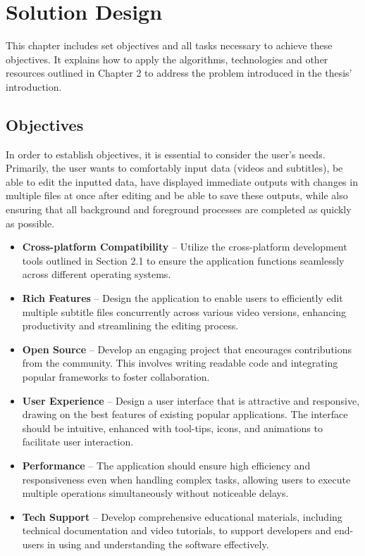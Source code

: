 \chapter{Solution Design}

This chapter includes set objectives and all tasks necessary to achieve these objectives. It explains how to apply the algorithms, technologies and other resources outlined in Chapter 2 to address the problem introduced in the thesis' introduction.

\section{Objectives}

In order to establish objectives, it is essential to consider the user's needs. Primarily, the user wants to comfortably input data (videos and subtitles), be able to edit the inputted data, have displayed immediate outputs with changes in multiple files at once after editing and be able to save these outputs, while also ensuring that all background and foreground processes are completed as quickly as possible.

\begin{itemize}
\item \textbf{Cross-platform Compatibility} -- Utilize the cross-platform development tools outlined in Section 2.1 to ensure the application functions seamlessly across different operating systems.
\item \textbf{Rich Features} -- Design the application to enable users to efficiently edit multiple subtitle files concurrently across various video versions, enhancing productivity and streamlining the editing process.
\item \textbf{Open Source} -- Develop an engaging project that encourages contributions from the community. This involves writing readable code and integrating popular frameworks to foster collaboration.
\item \textbf{User Experience} -- Design a user interface that is attractive and responsive, drawing on the best features of existing popular applications. The interface should be intuitive, enhanced with tool-tips, icons, and animations to facilitate user interaction.
\label{design:objectives:ui}
\item \textbf{Performance} -- The application should ensure high efficiency and responsiveness even when handling complex tasks, allowing users to execute multiple operations simultaneously without noticeable delays.
\item \textbf{Tech Support} -- Develop comprehensive educational materials, including technical documentation and video tutorials, to support developers and end-users in using and understanding the software effectively.
\end{itemize}

